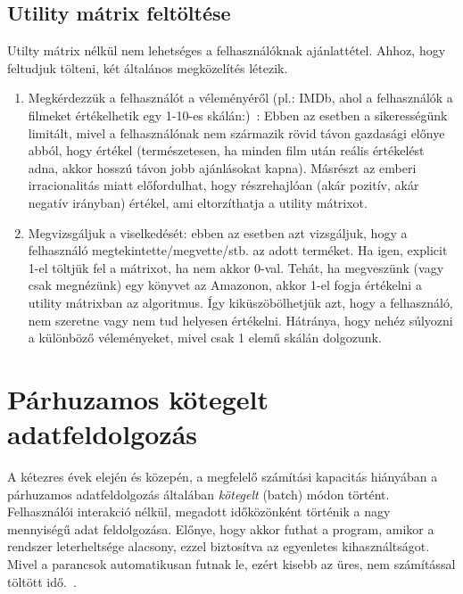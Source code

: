 \documentclass[a4paper,12pt]{article}
\begin{document}
\subsection{Utility mátrix feltöltése}
Utilty mátrix nélkül nem lehetséges a felhasználóknak ajánlattétel. Ahhoz, hogy feltudjuk tölteni, két általános megközelítés létezik.
\begin{enumerate}
\item Megkérdezzük a felhasználót a véleményéről (pl.: IMDb, ahol a felhasználók a filmeket értékelhetik egy 1-10-es skálán:)~\cite{imdb}: Ebben az esetben a sikerességünk limitált, mivel a felhasználónak nem származik rövid távon gazdasági előnye abból, hogy értékel (természetesen, ha minden film után reális értékelést adna, akkor hosszú távon jobb ajánlásokat kapna). Másrészt az emberi irracionalitás miatt előfordulhat, hogy részrehajlóan (akár pozitív, akár negatív irányban) értékel, ami eltorzíthatja a utility mátrixot. ~\cite{introspection}
\item Megvizsgáljuk a viselkedését: ebben az esetben azt vizsgáljuk, hogy a felhasználó megtekintette/megvette/stb. az adott terméket. Ha igen, explicit 1-el töltjük fel a mátrixot, ha nem akkor 0-val. Tehát, ha megveszünk (vagy csak megnézünk) egy könyvet az Amazonon, akkor 1-el fogja értékelni a utility mátrixban az algoritmus. Így kiküszöbölhetjük azt, hogy a felhasználó, nem szeretne vagy nem tud helyesen értékelni. Hátránya, hogy nehéz súlyozni a különböző véleményeket, mivel csak 1 elemű skálán dolgozunk.
\end{enumerate}

\section{Párhuzamos kötegelt adatfeldolgozás}
A kétezres évek elején és közepén, a megfelelő számítási kapacitás hiányában a párhuzamos adatfeldolgozás általában \textsl{kötegelt} (batch) módon történt. Felhasználói interakció nélkül, megadott időközönként történik a nagy mennyiségű adat feldolgozása. Előnye, hogy akkor futhat a program, amikor a rendszer leterheltsége alacsony, ezzel biztosítva az egyenletes kihasználtságot. Mivel a parancsok automatikusan futnak le, ezért kisebb az üres, nem számítással töltött idő.~\cite{batch}.
\end{document}
